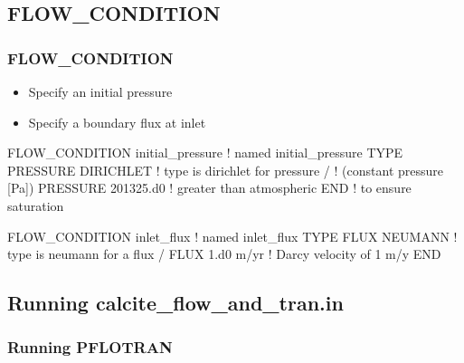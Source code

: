 \documentclass{beamer}
\newcommand\redcomment[1]{{{\color{red} #1}}}
\newcommand\bluecomment[1]{{{\color{blue} #1}}}
\newcommand\greencomment[1]{{{\color{green} #1}}}
\newcommand\magentacomment[1]{{{\color{magenta} #1}}}
\begin{document}
\subsection{FLOW\_CONDITION}

\begin{frame}[fragile]\frametitle{FLOW\_CONDITION}

\begin{itemize}
\item Specify an initial pressure
\item Specify a boundary flux at inlet
\end{itemize}

\begin{semiverbatim}
\magentacomment{FLOW_CONDITION initial_pressure} \bluecomment{! named \greencomment{initial_pressure}}
  \magentacomment{TYPE
    PRESSURE DIRICHLET}   \bluecomment{! type is \redcomment{dirichlet} for pressure}
  \magentacomment{/}                      \bluecomment{!   (constant pressure [Pa])}
  \magentacomment{PRESSURE 201325.d0}     \bluecomment{! greater than atmospheric}
\magentacomment{END}                      \bluecomment{!   to ensure saturation}

\magentacomment{FLOW_CONDITION inlet_flux} \bluecomment{! named \greencomment{inlet_flux}}
  \magentacomment{TYPE
    FLUX NEUMANN}          \bluecomment{! type is \redcomment{neumann} for a flux}
  \magentacomment{/
  FLUX 1.d0 m/yr}          \bluecomment{! Darcy velocity of 1 m/y}
\magentacomment{END}
\end{semiverbatim}

\end{frame}

\subsection{Running calcite_flow_and_tran.in}

\begin{frame}[fragile]\frametitle{Running PFLOTRAN}


\end{frame}
\end{document}
